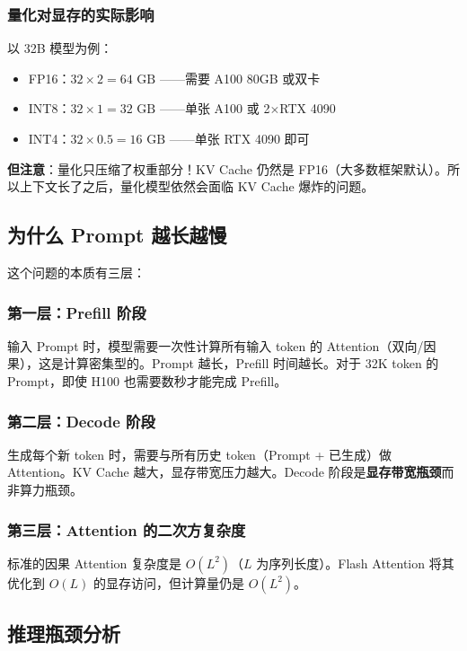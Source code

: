 \documentclass[UTF8,a4paper,10pt,oneside]{ctexart}
\begin{document}
\subsubsection{量化对显存的实际影响}

以 32B 模型为例：

\begin{itemize}
    \item FP16：$32 \times 2 = 64\text{ GB}$ ——需要 A100 80GB 或双卡
    \item INT8：$32 \times 1 = 32\text{ GB}$ ——单张 A100 或 2$\times$RTX 4090
    \item INT4：$32 \times 0.5 = 16\text{ GB}$ ——单张 RTX 4090 即可
\end{itemize}

\textbf{但注意}：量化只压缩了权重部分！KV Cache 仍然是 FP16（大多数框架默认）。所以上下文长了之后，量化模型依然会面临 KV Cache 爆炸的问题。

\subsection{为什么 Prompt 越长越慢}

这个问题的本质有三层：

\subsubsection{第一层：Prefill 阶段}

输入 Prompt 时，模型需要一次性计算所有输入 token 的 Attention（双向/因果），这是计算密集型的。Prompt 越长，Prefill 时间越长。对于 32K token 的 Prompt，即使 H100 也需要数秒才能完成 Prefill。

\subsubsection{第二层：Decode 阶段}

生成每个新 token 时，需要与所有历史 token（Prompt + 已生成）做 Attention。KV Cache 越大，显存带宽压力越大。Decode 阶段是\textbf{显存带宽瓶颈}而非算力瓶颈。

\subsubsection{第三层：Attention 的二次方复杂度}

标准的因果 Attention 复杂度是 $O(L^2)$（$L$ 为序列长度）。Flash Attention 将其优化到 $O(L)$ 的显存访问，但计算量仍是 $O(L^2)$。

\subsection{推理瓶颈分析}
\end{document}
